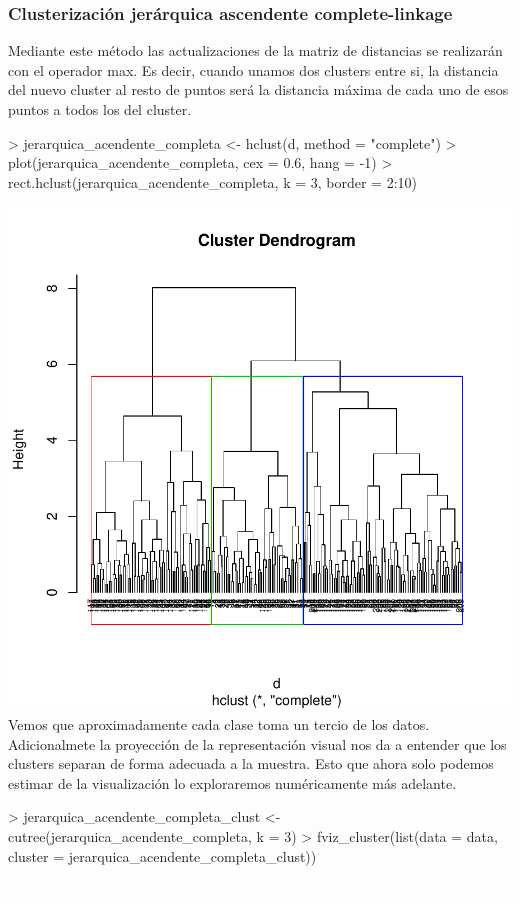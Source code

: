 \documentclass [a4paper] {article}
\begin{document}
\subsubsection{Clusterización jerárquica ascendente complete-linkage}
Mediante este método las actualizaciones de la matriz de distancias se realizarán con el operador max.
Es decir, cuando unamos dos clusters entre si, la distancia del nuevo cluster al resto de puntos será la distancia máxima de cada uno de esos puntos a todos los del cluster.
\begin{center}
\begin{Schunk}
\begin{Sinput}
> jerarquica_acendente_completa <- hclust(d, method = "complete")
> plot(jerarquica_acendente_completa, cex = 0.6, hang = -1)
> rect.hclust(jerarquica_acendente_completa, k = 3, border = 2:10)
\end{Sinput}
\end{Schunk}
\includegraphics{entrega-jerarquica_acendente_completa}
Vemos que aproximadamente cada clase toma un tercio de los datos.
Adicionalmete la proyección de la representación visual nos da a entender que los clusters separan de forma adecuada a la muestra.
Esto que ahora solo podemos estimar de la visualización lo exploraremos numéricamente más adelante.
\begin{Schunk}
\begin{Sinput}
> jerarquica_acendente_completa_clust <- cutree(jerarquica_acendente_completa, k = 3)
> fviz_cluster(list(data = data, cluster = jerarquica_acendente_completa_clust))
\end{Sinput}
\end{Schunk}
\includegraphics{entrega-jerarquica_acendente_completa_plot}
\end{center}
\end{document}
